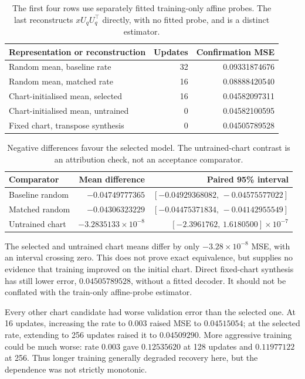 \documentclass[11pt,a4paper]{article}
\begin{document}
\begin{table}[ht]
\centering
\small
\begin{tabular}{@{}lrr@{}}
\toprule
Representation or reconstruction & Updates & Confirmation MSE\\
\midrule
Random mean, baseline rate & 32 & 0.09331874676\\
Random mean, matched rate & 16 & 0.08888420540\\
Chart-initialised mean, selected & 16 & 0.04582097311\\
Chart-initialised mean, untrained & 0 & 0.04582100595\\
Fixed chart, transpose synthesis & 0 & 0.04505789528\\
\bottomrule
\end{tabular}
\caption{The first four rows use separately fitted training-only affine
probes. The last reconstructs $xU_qU_q^\top$ directly, with no fitted
probe, and is a distinct estimator.}
\label{tab:mse}
\end{table}

\begin{table}[ht]
\centering
\small
\begin{tabular}{@{}lrr@{}}
\toprule
Comparator & Mean difference & Paired 95\% interval\\
\midrule
Baseline random & $-0.04749777365$ & $[-0.04929368082,\,-0.04575577022]$\\
Matched random & $-0.04306323229$ & $[-0.04475371834,\,-0.04142955549]$\\
Untrained chart & $-3.2835133\times10^{-8}$ &
$[-2.3961762,\,1.6180500]\times10^{-7}$\\
\bottomrule
\end{tabular}
\caption{Negative differences favour the selected model. The untrained-chart
contrast is an attribution check, not an acceptance comparator.}
\label{tab:contrasts}
\end{table}

The selected and untrained chart means differ by only
$-3.28\times10^{-8}$ MSE, with an interval crossing zero. This does not
prove exact equivalence, but supplies no evidence that training improved
on the initial chart. Direct fixed-chart synthesis has still lower error,
$0.04505789528$, without a fitted decoder. It should not be conflated with
the train-only affine-probe estimator.

Every other chart candidate had worse validation error than the selected
one. At 16 updates, increasing the rate to $0.003$ raised MSE to
$0.04515054$; at the selected rate, extending to 256 updates raised it to
$0.04509290$. More aggressive training could be much worse: rate $0.003$
gave $0.12535620$ at 128 updates and $0.11977122$ at 256. Thus longer
training generally degraded recovery here, but the dependence was not
strictly monotonic.
\end{document}

